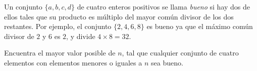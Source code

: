 Un conjunto $\{a, b, c, d\}$ de cuatro enteros positivos se llama \textit{bueno} si hay dos de ellos tales que su producto es múltiplo del mayor común divisor de los dos restantes. Por ejemplo, el conjunto $\{2, 4, 6, 8\}$ es bueno ya que el máximo común divisor de $2$ y $6$ es $2$, y divide $4\times 8=32$.

Encuentra el mayor valor posible de $n$, tal que cualquier conjunto de cuatro elementos con elementos menores o iguales a $n$ sea bueno.
